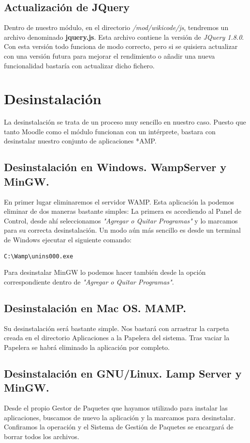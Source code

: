 \subsection{Actualización de JQuery}

Dentro de nuestro módulo, en el directorio \emph{/mod/wikicode/js}, tendremos un archivo denominado \textbf{jquery.js}. Esta archivo contiene la versión de \emph{JQuery 1.8.0}. Con esta versión todo funciona de modo correcto, pero si se quisiera actualizar con una versión futura para mejorar el rendimiento o añadir una nueva funcionalidad bastaría con actualizar dicho fichero.

\section{Desinstalación}

La desinstalación se trata de un proceso muy sencillo en nuestro caso. Puesto que tanto Moodle como el módulo funcionan con un intérprete, bastara con desinstalar nuestro conjunto de aplicaciones *AMP.

\subsection{Desinstalación en Windows. WampServer y MinGW.}
En primer lugar eliminaremos el servidor WAMP. Esta aplicación la podemos eliminar de dos maneras bastante simples: La primera es accediendo al Panel de Control, desde ahí seleccionamos \emph{"Agregar o Quitar Programas"} y lo marcamos para su correcta desinstalación. Un modo aún más sencillo es desde un terminal de Windows ejecutar el siguiente comando:

\begin{lstlisting}[style=consola]
	C:\Wamp\unins000.exe
\end{lstlisting}

Para desinstalar MinGW lo podemos hacer también desde la opción correspondiente dentro de \emph{"Agregar o Quitar Programas"}.
	
\subsection{Desinstalación en Mac OS. MAMP. }
Su desinstalación será bastante simple. Nos bastará con arrastrar la carpeta creada en el directorio Aplicaciones a la Papelera del sistema. Tras vaciar la Papelera se habrá eliminado la aplicación por completo.
	
\subsection{Desinstalación en GNU/Linux. Lamp Server y MinGW.}
Desde el propio Gestor de Paquetes que hayamos utilizado para instalar las aplicaciones, buscamos de nuevo la aplicación y la marcamos para desinstalar. Confiramos la operación y el Sistema de Gestión de Paquetes se encargará de borrar todos los archivos.
	
	
	
	
	
	
	
	
	
	
	
	
	
	
	
	
	
	
	
	
	
	
	
	
	
	
	
	
